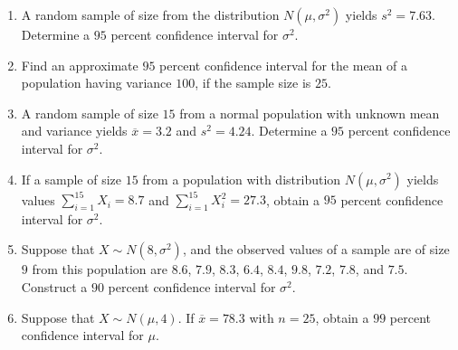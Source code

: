 \documentclass[svgnames]{amsart}
\begin{document}
\begin{enumerate}[leftmargin=*, itemsep=2mm]
\item A random sample of size from the distribution $N(\mu, \sigma^2)$ yields $s^2 = 7.63$. Determine a $95$ percent confidence interval for $\sigma^2$.

\item Find an approximate $95$ percent confidence interval for the mean of a population having variance $100$, if the sample size is $25$.

\item A random sample of size $15$ from a normal population with unknown mean and variance yields $\overline x = 3.2$ and $s^2 = 4.24$. Determine a $95$ percent confidence interval for $\sigma^2$.

\item If a sample of size $15$ from a population with distribution $N(\mu, \sigma^2)$ yields values $\sum_{i=1}^{15} X_i = 8.7$ and $\sum_{i = 1}^{15} X_i^2 = 27.3$, obtain a $95$ percent confidence interval for $\sigma^2$.

\item Suppose that $X \sim N(8, \sigma^2)$, and the observed values of a sample are of size $9$ from this population are $8.6$, $7.9$, $8.3$, $6.4$, $8.4$, $9.8$, $7.2$, $7.8$, and $7.5$. Construct a $90$ percent confidence interval for $\sigma^2$.

\item Suppose that $X \sim N(\mu, 4)$. If $\overline x = 78.3$ with $n = 25$, obtain a $99$ percent confidence interval for $\mu$.

\end{enumerate}
\end{document}
